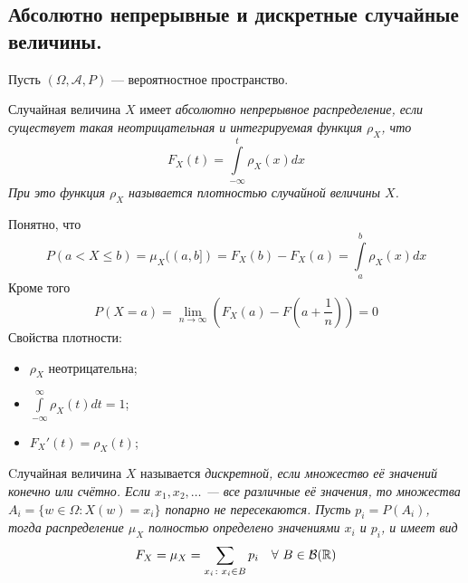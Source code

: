 \subsection{Абсолютно непрерывные и дискретные случайные величины.}
Пусть $(\Omega, \mathcal{A}, P)$ --- вероятностное пространство.
\begin{definition}
    Случайная величина $X$ имеет \it{абсолютно непрерывное распределение}, если существует такая неотрицательная
    и интегрируемая функция $\rho_X$, что
    \[
        F_X(t) = \int\limits_{-\infty}^{t} \rho_X(x) dx
    \]
    При это функция $\rho_X$ называется \it{плотностью} случайной величины $X$.
\end{definition}
Понятно, что
\[
    P(a < X \leq b) = \mu_X((a, b]) = F_X(b) - F_X(a) = \int\limits_{a}^{b} \rho_X(x) dx
\]
Кроме того
\[
    P(X = a) = \lim\limits_{n \to \infty}\left( F_X(a) - F\left( a + \frac{1}{n} \right) \right) = 0
\]
Свойства плотности:
\begin{itemize}
    \item $\rho_X$ неотрицательна;
    \item $\int\limits_{-\infty}^{\infty} \rho_X(t) dt = 1$;
    \item $F_X'(t) = \rho_X(t)$;
\end{itemize}
\begin{definition}
    Cлучайная величина $X$ называется \it{дискретной}, если множество её значений конечно или счётно. Если
    $x_1, x_2, \ldots$ --- все различные её значения, то множества $A_i = \{w \in \Omega \colon X(w) = x_i\}$
    попарно не пересекаются. Пусть $p_i = P(A_i)$, тогда распределение $\mu_X$ полностью определено значениями
    $x_i$ и $p_i$, и имеет вид
    \[
        F_X = \mu_X = \sum\limits_{x_i \colon x_i \in B} p_i ~~~ \forall ~ B \in \mathcal{B}(\mathbb{R})
    \]
\end{definition}

